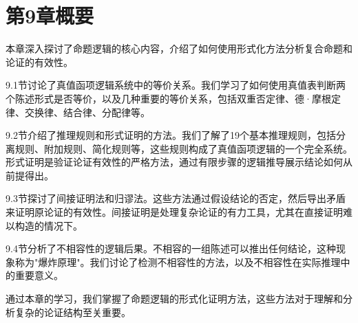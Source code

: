 \section{第9章概要}
本章深入探讨了命题逻辑的核心内容，介绍了如何使用形式化方法分析复合命题和论证的有效性。

9.1节讨论了真值函项逻辑系统中的等价关系。我们学习了如何使用真值表判断两个陈述形式是否等价，以及几种重要的等价关系，包括双重否定律、德·摩根定律、交换律、结合律、分配律等。

9.2节介绍了推理规则和形式证明的方法。我们了解了19个基本推理规则，包括分离规则、附加规则、简化规则等，这些规则构成了真值函项逻辑的一个完全系统。形式证明是验证论证有效性的严格方法，通过有限步骤的逻辑推导展示结论如何从前提得出。

9.3节探讨了间接证明法和归谬法。这些方法通过假设结论的否定，然后导出矛盾来证明原论证的有效性。间接证明是处理复杂论证的有力工具，尤其在直接证明难以构造的情况下。

9.4节分析了不相容性的逻辑后果。不相容的一组陈述可以推出任何结论，这种现象称为"爆炸原理"。我们讨论了检测不相容性的方法，以及不相容性在实际推理中的重要意义。

通过本章的学习，我们掌握了命题逻辑的形式化证明方法，这些方法对于理解和分析复杂的论证结构至关重要。

\printbibliography[heading=subbibliography,title={第9章参考文献}] 